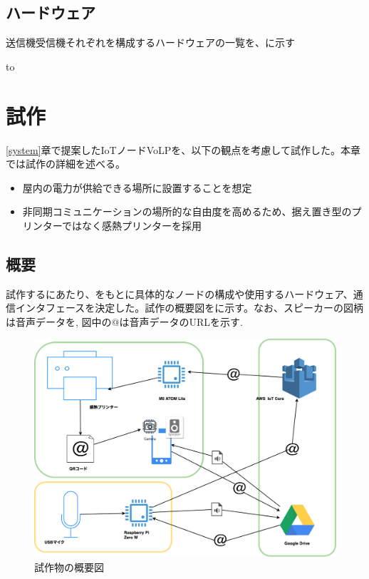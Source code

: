 \documentclass[submit,techrep,noauthor]{ipsj}
\begin{document}
\subsection{ハードウェア}
送信機受信機それぞれを構成するハードウェアの一覧を、に示す

\begin{table}[tb] 
\caption{ハードウェア一覧} 
\label{tab:sys-hardwares}
\hbox to
\end{table}

\section{試作}
\ref{system}章で提案したIoTノードVoLPを、以下の観点を考慮して試作した。本章では試作の詳細を述べる。
\begin{itemize}
    \item 屋内の電力が供給できる場所に設置することを想定
    \item 非同期コミュニケーションの場所的な自由度を高めるため、据え置き型のプリンターではなく感熱プリンターを採用
\end{itemize}
\subsection{概要}
試作するにあたり、をもとに具体的なノードの構成や使用するハードウェア、通信インタフェースを決定した。試作の概要図をに示す。なお、スピーカーの図柄は音声データを,
図中の@は音声データのURLを示す.
\begin{figure}[tb]
\includegraphics[scale=0.2,bb= 0 0 2000 1000]{image/proto_drawio.png}
\caption{試作物の概要図}
\label{fig:proto-overview}
\end{figure}
\end{document}
